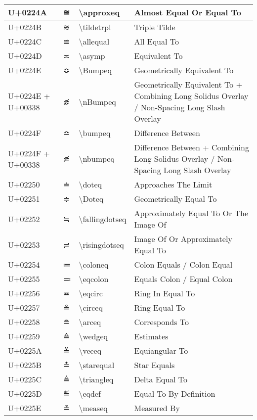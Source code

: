 \begin{table}[h]
\begin{tabulary}{\linewidth}{|L|L|L|L|}
U+0224A & ≊ & {\textbackslash}approxeq & Almost Equal Or Equal To \\
\hline
U+0224B & ≋ & {\textbackslash}tildetrpl & Triple Tilde \\
\hline
U+0224C & ≌ & {\textbackslash}allequal & All Equal To \\
\hline
U+0224D & ≍ & {\textbackslash}asymp & Equivalent To \\
\hline
U+0224E & ≎ & {\textbackslash}Bumpeq & Geometrically Equivalent To \\
\hline
U+0224E + U+00338 & ≎̸ & {\textbackslash}nBumpeq & Geometrically Equivalent To + Combining Long Solidus Overlay / Non-Spacing Long Slash Overlay \\
\hline
U+0224F & ≏ & {\textbackslash}bumpeq & Difference Between \\
\hline
U+0224F + U+00338 & ≏̸ & {\textbackslash}nbumpeq & Difference Between + Combining Long Solidus Overlay / Non-Spacing Long Slash Overlay \\
\hline
U+02250 & ≐ & {\textbackslash}doteq & Approaches The Limit \\
\hline
U+02251 & ≑ & {\textbackslash}Doteq & Geometrically Equal To \\
\hline
U+02252 & ≒ & {\textbackslash}fallingdotseq & Approximately Equal To Or The Image Of \\
\hline
U+02253 & ≓ & {\textbackslash}risingdotseq & Image Of Or Approximately Equal To \\
\hline
U+02254 & ≔ & {\textbackslash}coloneq & Colon Equals / Colon Equal \\
\hline
U+02255 & ≕ & {\textbackslash}eqcolon & Equals Colon / Equal Colon \\
\hline
U+02256 & ≖ & {\textbackslash}eqcirc & Ring In Equal To \\
\hline
U+02257 & ≗ & {\textbackslash}circeq & Ring Equal To \\
\hline
U+02258 & ≘ & {\textbackslash}arceq & Corresponds To \\
\hline
U+02259 & ≙ & {\textbackslash}wedgeq & Estimates \\
\hline
U+0225A & ≚ & {\textbackslash}veeeq & Equiangular To \\
\hline
U+0225B & ≛ & {\textbackslash}starequal & Star Equals \\
\hline
U+0225C & ≜ & {\textbackslash}triangleq & Delta Equal To \\
\hline
U+0225D & ≝ & {\textbackslash}eqdef & Equal To By Definition \\
\hline
U+0225E & ≞ & {\textbackslash}measeq & Measured By \\

\end{tabulary}
\end{table}
